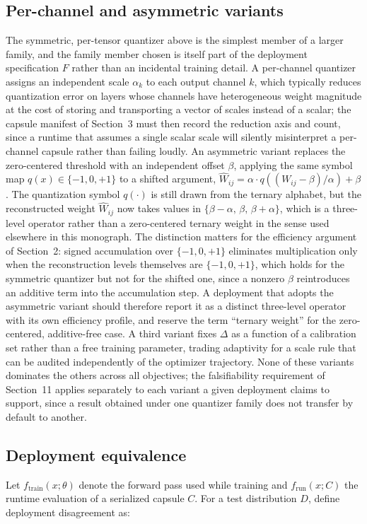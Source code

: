 \documentclass[11pt]{article}
\begin{document}
\subsection{Per-channel and asymmetric variants}
The symmetric, per-tensor quantizer above is the simplest member of a larger family, and the family member chosen is itself part of the deployment specification $F$ rather than an incidental training detail. A per-channel quantizer assigns an independent scale $\alpha_k$ to each output channel $k$, which typically reduces quantization error on layers whose channels have heterogeneous weight magnitude at the cost of storing and transporting a vector of scales instead of a scalar; the capsule manifest of Section~3 must then record the reduction axis and count, since a runtime that assumes a single scalar scale will silently misinterpret a per-channel capsule rather than failing loudly. An asymmetric variant replaces the zero-centered threshold with an independent offset $\beta$, applying the same symbol map $q(x) \in \{-1,0,+1\}$ to a shifted argument, $\hat{W}_{ij} = \alpha \cdot q((W_{ij}-\beta)/\alpha) + \beta$. The quantization symbol $q(\cdot)$ is still drawn from the ternary alphabet, but the reconstructed weight $\hat{W}_{ij}$ now takes values in $\{\beta-\alpha,\, \beta,\, \beta+\alpha\}$, which is a three-level operator rather than a zero-centered ternary weight in the sense used elsewhere in this monograph. The distinction matters for the efficiency argument of Section~2: signed accumulation over $\{-1,0,+1\}$ eliminates multiplication only when the reconstruction levels themselves are $\{-1,0,+1\}$, which holds for the symmetric quantizer but not for the shifted one, since a nonzero $\beta$ reintroduces an additive term into the accumulation step. A deployment that adopts the asymmetric variant should therefore report it as a distinct three-level operator with its own efficiency profile, and reserve the term ``ternary weight'' for the zero-centered, additive-free case. A third variant fixes $\Delta$ as a function of a calibration set rather than a free training parameter, trading adaptivity for a scale rule that can be audited independently of the optimizer trajectory. None of these variants dominates the others across all objectives; the falsifiability requirement of Section~11 applies separately to each variant a given deployment claims to support, since a result obtained under one quantizer family does not transfer by default to another.

\subsection{Deployment equivalence}
Let $f_{\text{train}}(x;\theta)$ denote the forward pass used while training and $f_{\text{run}}(x;C)$ the runtime evaluation of a serialized capsule $C$. For a test distribution $D$, define deployment disagreement as:
\end{document}
